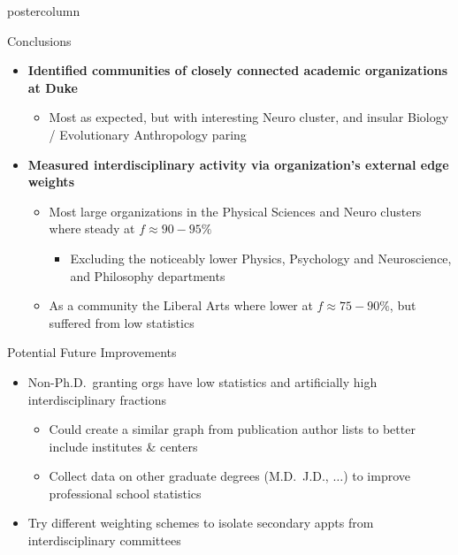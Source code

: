 \documentclass{beamer}
\begin{document}
\begin{frame}
\begin{columns}
\begin{column}{.57\textwidth}
\begin{beamercolorbox}[center]{postercolumn}
\begin{minipage}{.98\textwidth}
{  \begin{myblock}{Conclusions}
    \begin{itemize}
      \item \textbf{Identified communities of closely connected academic organizations at Duke}
      \begin{itemize}
        \item Most as expected, but with interesting Neuro cluster, and insular Biology / Evolutionary Anthropology paring
      \end{itemize}
      \item \textbf{Measured interdisciplinary activity via  organization's external edge weights }
      \begin{itemize}
        \item Most large organizations in the Physical Sciences and Neuro clusters where steady at $f \approx 90-95\%$
        \begin{itemize}
          \item Excluding the noticeably lower Physics, Psychology and Neuroscience, and Philosophy departments
        \end{itemize}
        \item As a community the Liberal Arts where lower at $f \approx 75-90\%$, but suffered from low statistics
      \end{itemize}
    \end{itemize}
  \end{myblock}\vfill


  \begin{myblock}{Potential Future Improvements}
    \begin{itemize}
      \item Non-Ph.D.\ granting orgs have low statistics and artificially high interdisciplinary fractions
      \begin{itemize}
        \item Could create a similar graph from publication author lists to better include institutes \& centers
        \item Collect data on other graduate degrees (M.D.\, J.D., $\ldots$) to improve professional school statistics
      \end{itemize}
      \item Try different weighting schemes to isolate secondary appts from interdisciplinary committees
    \end{itemize}
  \end{myblock}\vfill


}
\end{minipage}
\end{beamercolorbox}
\end{column}
\end{columns}
\end{frame}
\end{document}
